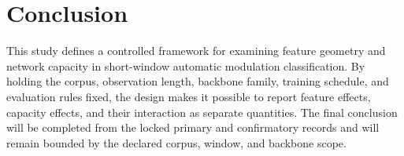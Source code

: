 \section{Conclusion}
This study defines a controlled framework for examining feature geometry and
network capacity in short-window automatic modulation classification. By
holding the corpus, observation length, backbone family, training schedule,
and evaluation rules fixed, the design makes it possible to report feature
effects, capacity effects, and their interaction as separate quantities. The
final conclusion will be completed from the locked primary and confirmatory
records and will remain bounded by the declared corpus, window, and backbone
scope.
